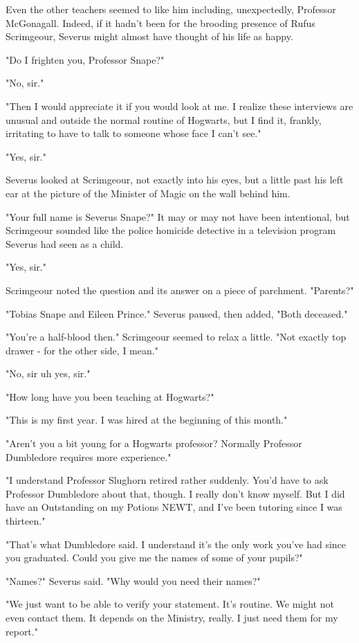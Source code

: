 Even the other teachers seemed to like him including, unexpectedly, Professor McGonagall. Indeed, if it hadn't been for the brooding presence of Rufus Scrimgeour, Severus might almost have thought of his life as happy.

"Do I frighten you, Professor Snape?"

"No, sir."

"Then I would appreciate it if you would look at me. I realize these interviews are unusual and outside the normal routine of Hogwarts, but I find it, frankly, irritating to have to talk to someone whose face I can't see."

"Yes, sir."

Severus looked at Scrimgeour, not exactly into his eyes, but a little past his left ear at the picture of the Minister of Magic on the wall behind him.

"Your full name is Severus Snape?" It may or may not have been intentional, but Scrimgeour sounded like the police homicide detective in a television program Severus had seen as a child.

"Yes, sir."

Scrimgeour noted the question and its answer on a piece of parchment. "Parents?"

"Tobias Snape and Eileen Prince." Severus paused, then added, "Both deceased."

"You're a half-blood then." Scrimgeour seemed to relax a little. "Not exactly top drawer - for the other side, I mean."

"No, sir{\el} uh{\el} yes, sir."

"How long have you been teaching at Hogwarts?"

"This is my first year. I was hired at the beginning of this month."

"Aren't you a bit young for a Hogwarts professor? Normally Professor Dumbledore requires more experience."

"I understand Professor Slughorn retired rather suddenly. You'd have to ask Professor Dumbledore about that, though. I really don't know myself. But I did have an Outstanding on my Potions NEWT, and I've been tutoring since I was thirteen."

"That's what Dumbledore said. I understand it's the only work you've had since you graduated. Could you give me the names of some of your pupils?"

"Names?" Severus said. "Why would you need their names?"

"We just want to be able to verify your statement. It's routine. We might not even contact them. It depends on the Ministry, really. I just need them for my report."

